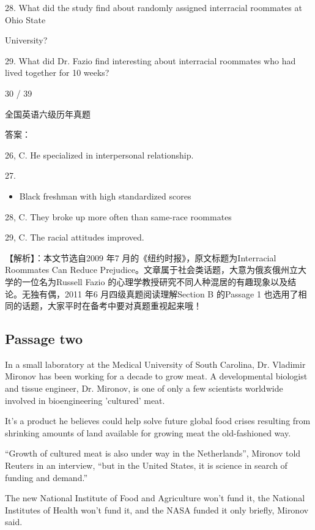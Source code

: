 \documentclass[UTF8,11pt]{ctexart}
\begin{document}
28. What did the study find about randomly assigned interracial roommates at Ohio State


University?


29. What did Dr. Fazio find interesting about interracial roommates who had lived together for 10 weeks?


30 / 39


全国英语六级历年真题


答案：


26, C. He specialized in interpersonal relationship.


27.


\begin{itemize}[leftmargin=2em,itemsep=.2em,topsep=.4em]\item[D.] Black freshman with high standardized scores
\end{itemize}

28, C. They broke up more often than same-race roommates


29, C. The racial attitudes improved.


【解析】：本文节选自2009 年7 月的《纽约时报》，原文标题为Interracial Roommates Can Reduce Prejudice。文章属于社会类话题，大意为俄亥俄州立大学的一位名为Russell Fazio 的心理学教授研究不同人种混居的有趣现象以及结论。无独有偶，2011 年6 月四级真题阅读理解Section B 的Passage 1 也选用了相同的话题，大家平时在备考中要对真题重视起来哦！


\subsection*{\textbf{Passage two}}


In a small laboratory at the Medical University of South Carolina, Dr. Vladimir Mironov has been working for a decade to grow meat. A developmental biologist and tissue engineer, Dr. Mironov, is one of only a few scientists worldwide involved in bioengineering 'cultured' meat.


It's a product he believes could help solve future global food crises resulting from shrinking amounts of land available for growing meat the old-fashioned way.


“Growth of cultured meat is also under way in the Netherlands”, Mironov told Reuters in an interview, “but in the United States, it is science in search of funding and demand.”


The new National Institute of Food and Agriculture won't fund it, the National Institutes of Health won't fund it, and the NASA funded it only briefly, Mironov said.
\end{document}
